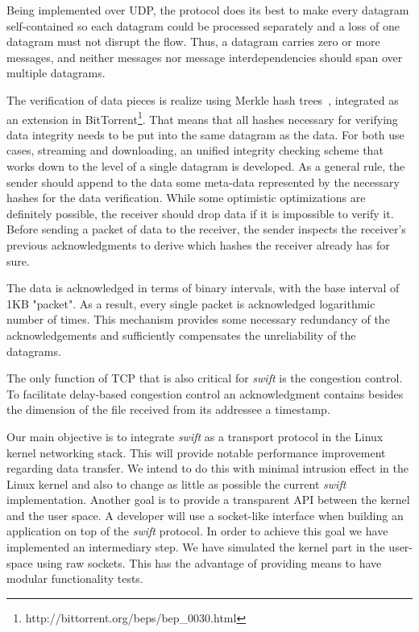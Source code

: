 Being implemented over UDP, the protocol does its best to make every datagram
self-contained so each datagram could be processed separately and a loss of
one datagram must not disrupt the flow. Thus, a datagram carries zero or more
messages, and neither messages nor message interdependencies should span over
multiple datagrams.

The verification of data pieces is realize using Merkle hash
trees~\cite{merkle}, integrated as an extension in
BitTorrent\footnote{http://bittorrent.org/beps/bep\_0030.html}. That means
that all hashes necessary for verifying data integrity needs to be put into
the same datagram as the data. For both use cases, streaming and downloading,
an unified  integrity checking scheme that works down to the level of a single
datagram is developed. As a general rule, the sender should append to the data
some meta-data represented by the necessary hashes for the data verification.
While some optimistic optimizations are definitely possible, the receiver
should drop data if it is impossible to verify it. Before sending a packet of
data to the receiver, the sender inspects the receiver's previous
acknowledgments to derive which hashes the receiver already has for sure.

The data is acknowledged in terms of binary intervals, with the base interval
of 1KB "packet". As a result, every single packet is acknowledged logarithmic
number of times. This mechanism provides some necessary redundancy of the
acknowledgements and sufficiently compensates the unreliability of the
datagrams.

The only function of TCP that is also critical for \textit{swift} is the
congestion control. To facilitate delay-based congestion control an
acknowledgment contains besides the dimension of the file received from its
addressee a timestamp.

Our main objective is to integrate \textit{swift} as a transport protocol in
the Linux kernel networking stack. This will provide notable performance
improvement regarding data transfer. We intend to do this with minimal
intrusion effect in the Linux kernel and also to change as little as possible
the current \textit{swift} implementation. Another goal is to provide a
transparent API between the kernel and the user space. A developer will use a
socket-like interface when building an application on top of the
\textit{swift} protocol. In order to achieve this goal we have implemented an
intermediary step. We have simulated the kernel part in the user-space using
raw sockets. This has the advantage of providing means to have modular
functionality tests.

